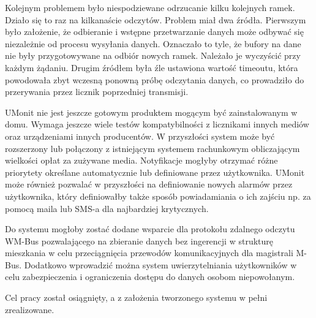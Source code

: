 Kolejnym problemem było niespodziewane odrzucanie kilku kolejnych ramek.
Działo się to raz na kilkanaście odczytów.
Problem miał dwa źródła.
Pierwszym było założenie, że odbieranie i wstępne przetwarzanie danych może odbywać się niezależnie od procesu wysyłania danych.
Oznaczało to tyle, że bufory na dane nie były przygotowywane na odbiór nowych ramek.
Należało je wyczyścić przy każdym żądaniu.
Drugim źródłem była źle ustawiona wartość timeoutu, która powodowała zbyt wczesną ponowną próbę odczytania danych, co prowadziło do przerywania przez licznik poprzedniej transmisji.

UMonit nie jest jeszcze gotowym produktem mogącym być zainstalowanym w domu.
Wymaga jeszcze wiele testów kompatybilności z licznikami innych mediów oraz urządzeniami innych producentów.
W przyszłości system może być rozszerzony lub połączony z istniejącym systemem rachunkowym obliczającym wielkości opłat za zużywane media.
Notyfikacje mogłyby otrzymać różne priorytety określane automatycznie lub definiowane przez użytkownika.
UMonit może również pozwalać w przyszłości na definiowanie nowych alarmów przez użytkownika, który definiowałby także sposób powiadamiania o ich zajściu np. za pomocą maila lub SMS-a dla najbardziej krytycznych.

Do systemu mogłoby zostać dodane wsparcie dla protokołu zdalnego odczytu WM-Bus pozwalającego na zbieranie danych bez ingerencji w strukturę mieszkania w celu przeciągnięcia przewodów komunikacyjnych dla magistrali M-Bus.
Dodatkowo wprowadzić można system uwierzytelniania użytkowników w celu zabezpieczenia i ograniczenia dostępu do danych osobom niepowołanym.

Cel pracy został osiągnięty, a z założenia tworzonego systemu w pełni zrealizowane.
